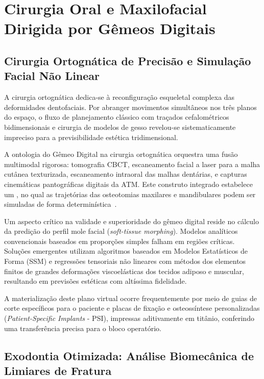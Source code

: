 \section{Cirurgia Oral e Maxilofacial Dirigida por Gêmeos Digitais}

\subsection{Cirurgia Ortognática de Precisão e Simulação Facial Não Linear}

A cirurgia ortognática dedica-se à reconfiguração esqueletal complexa das deformidades dentofaciais. Por abranger movimentos simultâneos nos três planos do espaço, o fluxo de planejamento clássico com traçados cefalométricos bidimensionais e cirurgia de modelos de gesso revelou-se sistematicamente impreciso para a previsibilidade estética tridimensional.

A ontologia do Gêmeo Digital na cirurgia ortognática orquestra uma fusão multimodal rigorosa: tomografia CBCT, escaneamento facial a laser para a malha cutânea texturizada, escaneamento intraoral das malhas dentárias, e capturas cinemáticas pantográficas digitais da ATM. Este construto integrado estabelece um , no qual as trajetórias das osteotomias maxilares e mandibulares podem ser simuladas de forma determinística~\cite{li2024aligner}.

Um aspecto crítico na validade e superioridade do gêmeo digital reside no cálculo da predição do perfil mole facial (\textit{soft-tissue morphing}). Modelos analíticos convencionais baseados em proporções simples falham em regiões críticas. Soluções emergentes utilizam algoritmos baseados em Modelos Estatísticos de Forma (SSM) e regressões tensoriais não lineares com métodos dos elementos finitos de grandes deformações viscoelásticas dos tecidos adiposo e muscular, resultando em previsões estéticas com altíssima fidelidade.

A materialização deste plano virtual ocorre frequentemente por meio de guias de corte específicos para o paciente e placas de fixação e osteossíntese personalizadas (\textit{Patient-Specific Implants} - PSI), impressas aditivamente em titânio, conferindo uma transferência precisa para o bloco operatório.

\subsection{Exodontia Otimizada: Análise Biomecânica de Limiares de Fratura}

